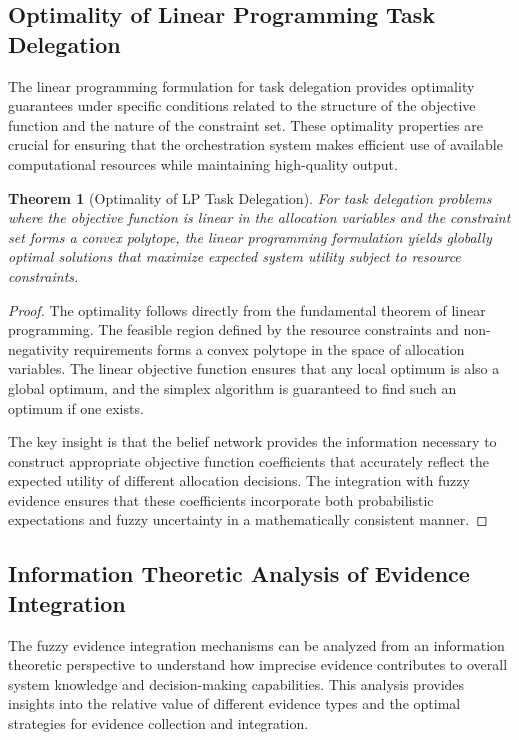 \documentclass[12pt,a4paper]{article}
\newtheorem{theorem}{Theorem}[section]
\begin{document}
\subsection{Optimality of Linear Programming Task Delegation}

The linear programming formulation for task delegation provides optimality guarantees under specific conditions related to the structure of the objective function and the nature of the constraint set. These optimality properties are crucial for ensuring that the orchestration system makes efficient use of available computational resources while maintaining high-quality output.

\begin{theorem}[Optimality of LP Task Delegation]
For task delegation problems where the objective function is linear in the allocation variables and the constraint set forms a convex polytope, the linear programming formulation yields globally optimal solutions that maximize expected system utility subject to resource constraints.
\end{theorem}

\begin{proof}
The optimality follows directly from the fundamental theorem of linear programming. The feasible region defined by the resource constraints and non-negativity requirements forms a convex polytope in the space of allocation variables. The linear objective function ensures that any local optimum is also a global optimum, and the simplex algorithm is guaranteed to find such an optimum if one exists.

The key insight is that the belief network provides the information necessary to construct appropriate objective function coefficients that accurately reflect the expected utility of different allocation decisions. The integration with fuzzy evidence ensures that these coefficients incorporate both probabilistic expectations and fuzzy uncertainty in a mathematically consistent manner.
\end{proof}

\subsection{Information Theoretic Analysis of Evidence Integration}

The fuzzy evidence integration mechanisms can be analyzed from an information theoretic perspective to understand how imprecise evidence contributes to overall system knowledge and decision-making capabilities. This analysis provides insights into the relative value of different evidence types and the optimal strategies for evidence collection and integration.
\end{document}
